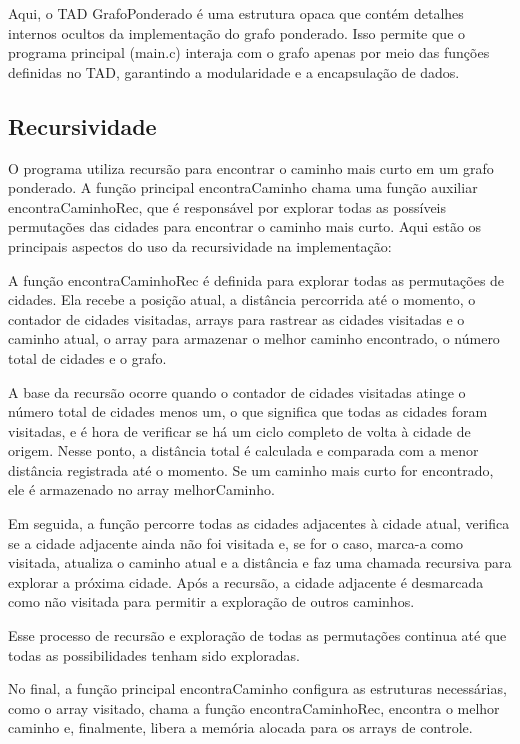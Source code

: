 \documentclass[12pt]{spieman}
\begin{document}
Aqui, o TAD GrafoPonderado é uma estrutura opaca que contém detalhes internos ocultos da implementação do grafo ponderado. Isso permite que o programa principal (main.c) interaja com o grafo apenas por meio das funções definidas no TAD, garantindo a modularidade e a encapsulação de dados.

\subsection{Recursividade}
O programa utiliza recursão para encontrar o caminho mais curto em um grafo ponderado. A função principal encontraCaminho chama uma função auxiliar encontraCaminhoRec, que é responsável por explorar todas as possíveis permutações das cidades para encontrar o caminho mais curto. Aqui estão os principais aspectos do uso da recursividade na implementação:

A função encontraCaminhoRec é definida para explorar todas as permutações de cidades. Ela recebe a posição atual, a distância percorrida até o momento, o contador de cidades visitadas, arrays para rastrear as cidades visitadas e o caminho atual, o array para armazenar o melhor caminho encontrado, o número total de cidades e o grafo.

A base da recursão ocorre quando o contador de cidades visitadas atinge o número total de cidades menos um, o que significa que todas as cidades foram visitadas, e é hora de verificar se há um ciclo completo de volta à cidade de origem. Nesse ponto, a distância total é calculada e comparada com a menor distância registrada até o momento. Se um caminho mais curto for encontrado, ele é armazenado no array melhorCaminho.

Em seguida, a função percorre todas as cidades adjacentes à cidade atual, verifica se a cidade adjacente ainda não foi visitada e, se for o caso, marca-a como visitada, atualiza o caminho atual e a distância e faz uma chamada recursiva para explorar a próxima cidade. Após a recursão, a cidade adjacente é desmarcada como não visitada para permitir a exploração de outros caminhos.

Esse processo de recursão e exploração de todas as permutações continua até que todas as possibilidades tenham sido exploradas.

No final, a função principal encontraCaminho configura as estruturas necessárias, como o array visitado, chama a função encontraCaminhoRec, encontra o melhor caminho e, finalmente, libera a memória alocada para os arrays de controle.
\end{document}
